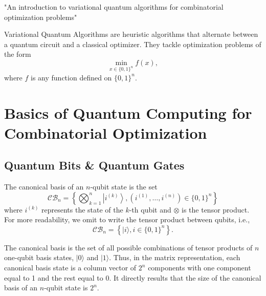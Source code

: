 "An introduction to variational quantum algorithms for combinatorial optimization problems" \cite{grange2023introduction}

\vspace{10pt}

Variational Quantum Algorithms are heuristic algorithms that alternate between a quantum circuit and a classical optimizer. They tackle optimization problems of the form
\begin{equation}
    \min _{x \in\{0,1\}^n} f(x), \tag{1}
\end{equation}
where $f$ is any function defined on $\{0,1\}^n$. 

\section{Basics of Quantum Computing for Combinatorial Optimization}

\subsection{Quantum Bits \& Quantum Gates}

\begin{definition}
    The canonical basis of an $n$-qubit state is the set
\begin{equation}
    \mathcal{CB}_{n}=
\left\{\bigotimes_{k=1}^{n}\left|i^{(k)}\right\rangle,\left(i^{(1)}, \ldots, i^{(n)}\right) \in\{0,1\}^{n}\right\}
\end{equation}
where $i^{(k)}$ represents the state of the $k$-th qubit and $\otimes$ is the tensor product. For more readability, we omit to write the tensor product between qubits, i.e.,
\begin{equation}
    \mathcal{C B}_{n}=\left\{|i\rangle, i \in\{0,1\}^{n}\right\}.
\end{equation}
\end{definition}

The canonical basis is the set of all possible combinations of tensor products of $n$ one-qubit basis states, $|0\rangle$ and $|1\rangle$. Thus, in the matrix representation, each canonical basis state is a column vector of $2^{n}$ components with one component equal to 1 and the rest equal to 0. It directly results that the size of the canonical basis of an $n$-qubit state is $2^{n}$. 



